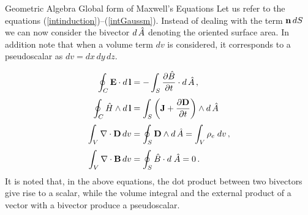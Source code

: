 \documentclass[handout,10pt]{beamer}
\begin{document}
\begin{frame}[shrink=10]{Geometric Algebra Global form of Maxwell's Equations}
Let us refer to the equations (\ref{intinduction})--(\ref{intGaussm}).
Instead of dealing with the term $\mathbf{n} \, dS$ we can now consider the bivector $d\, \hat{A}$ denoting the oriented surface area. In addition note that when a volume term $dv$ is considered, it corresponds to a pseudoscalar as $dv = dx\, dy \, dz$.

\pause
\begin{subequations}
\begin{align}
  \oint_{C} {\mathbf{E}} \cdot d\,{\mathbf{l}}   & =
- \int_{S}\frac{\partial \hat{B} }{ \partial t} \cdot
d \,\hat{A} \,,
  \label{intinductionGA}
\\[1mm]
  \oint_{C} {\hat{H}} \wedge d\, \mathbf{l}   & =
\int_{S} \left( \mathbf{J} + \frac{\partial \mathbf{D}} { \partial t} \right) \wedge
d\,{\hat{A}}   \label{intAmpereGA}
\\[1mm]
 \int_{V} \nabla \cdot {\mathbf{D}} \, dv   & =
\oint_{S}{\mathbf{D}} \wedge d\,{\hat{A}}  = \int_{V}
\rho_e  \; dv \,,
  \label{intGausseGA}
\\[1mm]
 \int_{V} \nabla \cdot {\mathbf{B}} \, dv   & =
\oint_{S}{\hat{B}} \cdot d \; \hat{A} = 0 \,.
  \label{intGaussmGA}
\end{align}
\end{subequations}
\pause
It is noted that, in the above equations, the dot product between two bivectors give rise to a scalar, while the volume integral and the external product of a vector with a bivector produce a pseudoscalar.



\end{frame}
\end{document}
